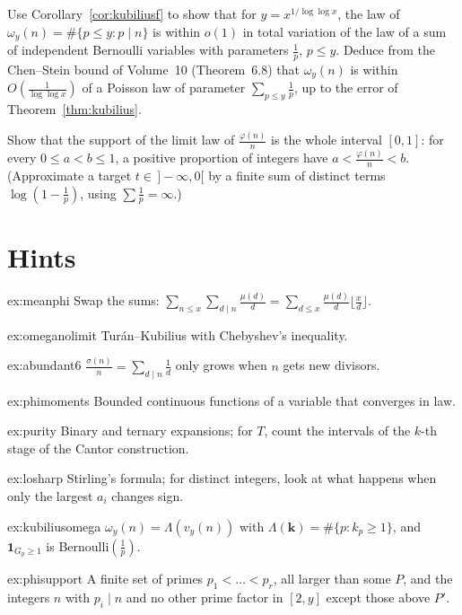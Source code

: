 \begin{exercise}[$\star\star$]\label{ex:kubiliusomega}
Use Corollary~\ref{cor:kubiliusf} to show that for $y=x^{1/\log\log x}$, the law of $\omega_y(n)=\#\{p\le y:p\mid n\}$ is within $o(1)$ in total variation of the law of a sum of independent Bernoulli variables with parameters $\frac1p$, $p\le y$. Deduce from the Chen--Stein bound of Volume~10 (Theorem~6.8) that $\omega_y(n)$ is within $O(\frac1{\log\log x})$ of a Poisson law of parameter $\sum_{p\le y}\frac1p$, up to the error of Theorem~\ref{thm:kubilius}.
\end{exercise}

\begin{exercise}[$\star\star\star$]\label{ex:phisupport}
Show that the support of the limit law of $\frac{\varphi(n)}n$ is the whole interval $[0,1]$: for every $0\le a<b\le1$, a positive proportion of integers have $a<\frac{\varphi(n)}n<b$. (Approximate a target $t\in\,]-\infty,0[$ by a finite sum of distinct terms $\log(1-\frac1p)$, using $\sum\frac1p=\infty$.)
\end{exercise}

\section{Hints}

\begin{hint}{ex:meanphi}
Swap the sums: $\sum_{n\le x}\sum_{d\mid n}\frac{\mu(d)}d=\sum_{d\le x}\frac{\mu(d)}d\lfloor\frac xd\rfloor$.
\end{hint}
\begin{hint}{ex:omeganolimit}
Tur\'an--Kubilius with Chebyshev's inequality.
\end{hint}
\begin{hint}{ex:abundant6}
$\frac{\sigma(n)}n=\sum_{d\mid n}\frac1d$ only grows when $n$ gets new divisors.
\end{hint}
\begin{hint}{ex:phimoments}
Bounded continuous functions of a variable that converges in law.
\end{hint}
\begin{hint}{ex:purity}
Binary and ternary expansions; for $T$, count the intervals of the $k$-th stage of the Cantor construction.
\end{hint}
\begin{hint}{ex:losharp}
Stirling's formula; for distinct integers, look at what happens when only the largest $a_i$ changes sign.
\end{hint}
\begin{hint}{ex:kubiliusomega}
$\omega_y(n)=\Lambda(v_y(n))$ with $\Lambda(\mathbf k)=\#\{p:k_p\ge1\}$, and $\mathbf 1_{G_p\ge1}$ is Bernoulli$(\frac1p)$.
\end{hint}
\begin{hint}{ex:phisupport}
A finite set of primes $p_1<\dots<p_r$, all larger than some $P$, and the integers $n$ with $p_i\mid n$ and no other prime factor in $[2,y]$ except those above $P'$.
\end{hint}

